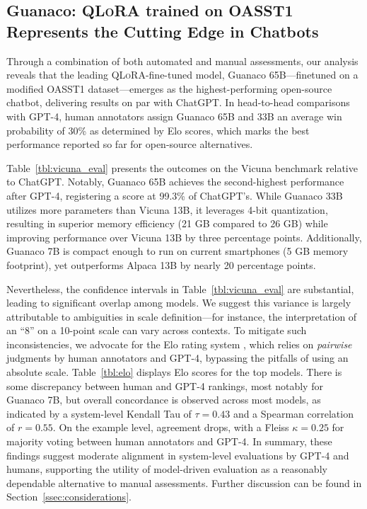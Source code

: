 \subsection{\textbf{Guanaco}: \textsc{QLoRA} trained on OASST1 Represents the Cutting Edge in Chatbots}

Through a combination of both automated and manual assessments, our analysis reveals that the leading \textsc{QLoRA}-fine-tuned model, {Guanaco} 65B—finetuned on a modified OASST1 dataset—emerges as the highest-performing open-source chatbot, delivering results on par with ChatGPT. In head-to-head comparisons with GPT-4, human annotators assign {Guanaco} 65B and 33B an average win probability of 30\% as determined by Elo scores, which marks the best performance reported so far for open-source alternatives.

Table~\ref{tbl:vicuna_eval} presents the outcomes on the Vicuna benchmark \cite{vicuna2023} relative to ChatGPT. Notably, {Guanaco} 65B achieves the second-highest performance after GPT-4, registering a score at 99.3\% of ChatGPT’s. While {Guanaco} 33B utilizes more parameters than Vicuna 13B, it leverages 4-bit quantization, resulting in superior memory efficiency (21 GB compared to 26 GB) while improving performance over Vicuna 13B by three percentage points. Additionally, {Guanaco} 7B is compact enough to run on current smartphones (5 GB memory footprint), yet outperforms Alpaca 13B by nearly 20 percentage points.

Nevertheless, the confidence intervals in Table~\ref{tbl:vicuna_eval} are substantial, leading to significant overlap among models. We suggest this variance is largely attributable to ambiguities in scale definition—for instance, the interpretation of an “8” on a 10-point scale can vary across contexts. To mitigate such inconsistencies, we advocate for the Elo rating system \citep{elo1967proposed}, which relies on \textit{pairwise} judgments by human annotators and GPT-4, bypassing the pitfalls of using an absolute scale. Table~\ref{tbl:elo} displays Elo scores for the top models. There is some discrepancy between human and GPT-4 rankings, most notably for Guanaco 7B, but overall concordance is observed across most models, as indicated by a system-level Kendall Tau of $\tau=0.43$ and a Spearman correlation of $r=0.55$. On the example level, agreement drops, with a Fleiss $\kappa=0.25$ for majority voting between human annotators and GPT-4. In summary, these findings suggest moderate alignment in system-level evaluations by GPT-4 and humans, supporting the utility of model-driven evaluation as a reasonably dependable alternative to manual assessments. Further discussion can be found in Section~\ref{ssec:considerations}.

